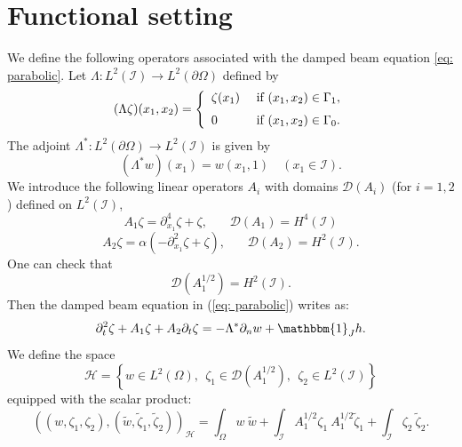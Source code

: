 \documentclass[a4paper, 12pt]{article}
\theoremstyle{plain}
\theoremstyle{definition}
\numberwithin{theorem}{section}
\numberwithin{equation}{section}
\begin{document}
\section{Functional setting} \label{section_functional_setting}
We define the following operators associated with the damped beam equation \eqref{eq: parabolic}. Let $\Lambda : L^2(\mathcal{I})\to L^2(\partial\Omega)$ defined by  
\begin{equation}\label{defLambda}
(\Lambda\zeta)(x_1,x_2)= \left\{\begin{array}{ll}\zeta(x_1)& \mbox{ if }(x_1,x_2)\in \Gamma_1,\medskip  \\0& \mbox{ if }(x_1,x_2)\in \Gamma_0.\end{array}\right.
\end{equation}
The adjoint $\Lambda^*: L^2(\partial\Omega) \to L^2(\mathcal{I})$ is given by
\begin{equation}\label{defLambdastar}
(\Lambda^* w)(x_1)= w(x_1,1)\quad (x_1\in \mathcal{I}). 
\end{equation}
We introduce the following linear operators $A_i$ with domains $\mathcal{D}(A_i)$ (for $i=1,2$) defined on $L^2(\mathcal{I})$,
\begin{equation}\label{DefA1}
    A_1\zeta=\partial_{x_1}^4\zeta+\zeta,~~~~~~~~\mathcal{D}(A_1)=H^4(\mathcal{I})
\end{equation}
\begin{equation}\label{DefA2}
A_2\zeta=\alpha\left(-\partial_{x_1}^2\zeta+\zeta\right),~~~~~~~~\mathcal{D}(A_2)=H^2(\mathcal{I}).
\end{equation}
One can check that
$$
\mathcal{D}(A_1^{1/2})=H^2(\mathcal{I}).
$$
Then the damped beam equation in (\ref{eq: parabolic}) writes as:
$$\partial^2_t\zeta+A_1\zeta+ A_2\partial_t\zeta=-\Lambda^* \partial_nw+\mathbbm{1}_{J} h .$$
We define the space 
$$\mathscr{H}=\left\{w\in L^2(\Omega),~~\zeta_1\in \mathcal{D}(A_1^{1/2}),~~\zeta_2\in L^2(\mathcal{I})\right\}$$
equipped with the scalar product:
$$\left((w,\zeta_1,\zeta_2),(\widetilde{w},\widetilde{\zeta}_1,\widetilde{\zeta}_2)\right)_{\mathscr{H}}=\int_\Omega w~\widetilde{w}+\int_{\mathcal{I}}A_1^{1/2} \zeta_1 ~ A_1^{1/2} \widetilde{\zeta}_1+\int_{\mathcal{I}}\zeta_2~ \widetilde{\zeta}_2.$$
\end{document}
